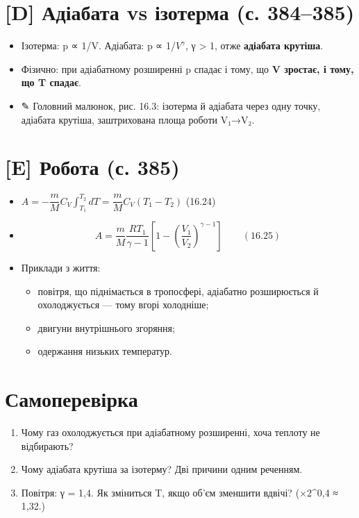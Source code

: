 \documentclass[11pt,a4paper,oneside]{book}
\newcommand{\pen}{{\sffamily\color{accent}✎}}
\begin{document}
\section*{[D] Адіабата vs ізотерма (с. 384–385)}
\begin{itemize}
\item Ізотерма: p ∝ 1/V. Адіабата: p ∝ 1/$V^{γ}$, γ > 1, отже \textbf{адіабата крутіша}.
\item Фізично: при адіабатному розширенні p спадає і тому, що \textbf{V зростає, і тому, що T спадає}.
\item \pen{} Головний малюнок, рис. 16.3: ізотерма й адіабата через одну точку, адіабата крутіша, заштрихована площа роботи V₁→V₂.
\end{itemize}

\section*{[E] Робота (с. 385)}
\begin{itemize}
\item $A = -\dfrac mMC_V\int_{T_1}^{T_2}dT = \dfrac mMC_V(T_1 - T_2)$ (16.24)
\item \[A = \frac mM\frac{RT_1}{\gamma - 1}\left[1 - \left(\frac{V_1}{V_2}\right)^{\gamma-1}\right]\qquad(16.25)\]
\item Приклади з життя:
\begin{itemize}
\item повітря, що піднімається в тропосфері, адіабатно розширюється й охолоджується — тому вгорі холодніше;
\item двигуни внутрішнього згоряння;
\item одержання низьких температур.
\end{itemize}
\end{itemize}

\section*{Самоперевірка}
\begin{enumerate}
\item Чому газ охолоджується при адіабатному розширенні, хоча теплоту не відбирають?
\item Чому адіабата крутіша за ізотерму? Дві причини одним реченням.
\item Повітря: γ = 1,4. Як зміниться T, якщо об'єм зменшити вдвічі? (×2\textasciicircum{}0,4 ≈ 1,32.)
\end{enumerate}
\end{document}
